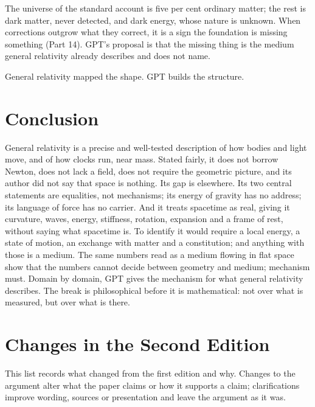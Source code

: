  The universe of the standard account is five per cent ordinary matter; the rest is dark matter, never detected, and dark energy, whose nature is unknown. When corrections outgrow what they correct, it is a sign the foundation is missing something (Part 14). GPT's proposal is that the missing thing is the medium general relativity already describes and does not name.

General relativity mapped the shape. GPT builds the structure.

\section*{Conclusion}

General relativity is a precise and well-tested description of how bodies and light move, and of how clocks run, near mass. Stated fairly, it does not borrow Newton, does not lack a field, does not require the geometric picture, and its author did not say that space is nothing. Its gap is elsewhere. Its two central statements are equalities, not mechanisms; its energy of gravity has no address; its language of force has no carrier. And it treats spacetime as real, giving it curvature, waves, energy, stiffness, rotation, expansion and a frame of rest, without saying what spacetime is. To identify it would require a local energy, a state of motion, an exchange with matter and a constitution; and anything with those is a medium. The same numbers read as a medium flowing in flat space show that the numbers cannot decide between geometry and medium; mechanism must. Domain by domain, GPT gives the mechanism for what general relativity describes. The break is philosophical before it is mathematical: not over what is measured, but over what is there.

\clearpage
\section*{Changes in the Second Edition}

This list records what changed from the first edition and why. Changes to the argument alter what the paper claims or how it supports a claim; clarifications improve wording, sources or presentation and leave the argument as it was.

